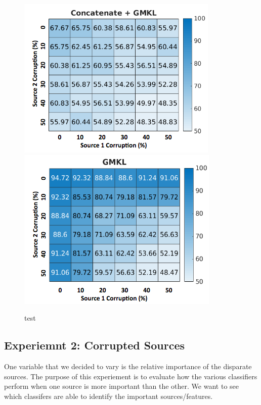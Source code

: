 \documentclass{article}
\begin{document}
\begin{figure}[h]
\includegraphics[scale=0.6]{experimentpic2.png}
\includegraphics[scale=0.6]{experimentpic3.png}
\caption{test}
\end{figure}









\subsection{Experiemnt 2: Corrupted Sources}

One variable that we decided to vary is the relative importance of the disparate sources. The purpose of this experiement is to evaluate how the various classifiers perform when one source is more important than the other. We want to see which classifers are able to identify the important sources/features.
\end{document}
